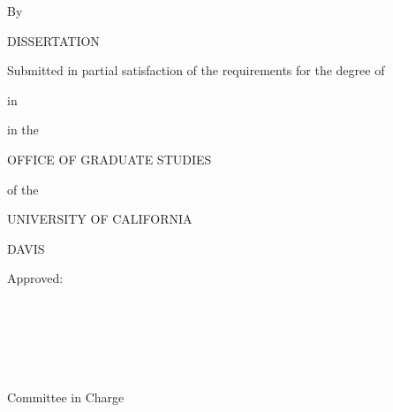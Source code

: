 \begin{center}
   \null\vfill

   \textbf{\DissertationTitle}

   \bigskip

   By

   \bigskip

   \MakeUppercase{\AuthorName}

   \bigskip

   DISSERTATION

   \bigskip

   Submitted in partial satisfaction of the requirements for the degree of

   \bigskip

   \MakeUppercase{\DegreeName}

   \bigskip

   in

   \bigskip

   \DepartmentName

   \bigskip

   in the

   \bigskip

   OFFICE OF GRADUATE STUDIES

   \bigskip

   of the

   \bigskip

   UNIVERSITY OF CALIFORNIA

   \bigskip

   DAVIS

   \bigskip

   Approved:

   \bigskip
   \bigskip

   \makebox[3in]{\hrulefill} \\
   \Chair

   \bigskip
   \bigskip

   \makebox[3in]{\hrulefill} \\
   \CommitteeMemberTwo

   \bigskip
   \bigskip

   \makebox[3in]{\hrulefill} \\
   \CommitteeMemberThree

   \bigskip

   Committee in Charge

   \bigskip

   \GraduationYear

   \vfill
\end{center}